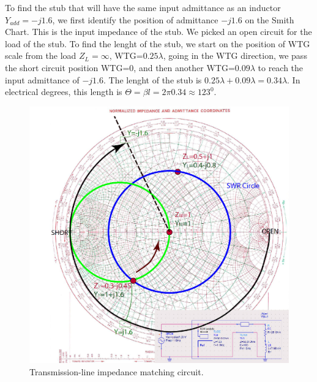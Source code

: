 \documentclass{ximera}
\begin{document}
To find the stub that will have the same input admittance as an inductor $Y_{add}=-j1.6$, we first identify the position of admittance $-j1.6$ on the Smith Chart. This is the input impedance of the stub. We picked an open circuit for the load of the stub. To find the lenght of the stub, we start on the position of WTG scale from the load $Z_L=\infty$, WTG=$0.25 \lambda$, going in the WTG direction, we pass the short circuit position WTG=$0$, and then another WTG=$0.09 \lambda$ to reach the input admittance of $-j1.6$. The lenght of the stub is $0.25 \lambda+0.09 \lambda=0.34 \lambda$. In electrical degrees, this length is $\Theta=\beta l =2 \pi 0.34 \approx 123^0$.




\begin{figure}[htbp]
\begin{center}
\includegraphics[scale=1]{../jpg/MatchTL-01.jpg}
\end{center}
\caption{Transmission-line impedance matching circuit.}
\label{fig:TransLineImpM}
\end{figure}
\end{document}
